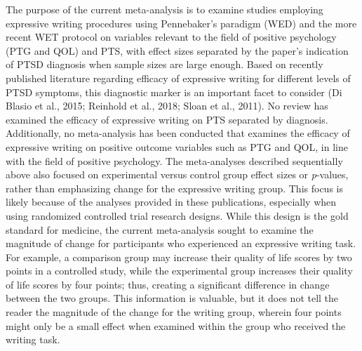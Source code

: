 \documentclass[man, mask]{apa6}
\theoremstyle{definition}
\theoremstyle{definition}
\theoremstyle{definition}
\theoremstyle{remark}
\begin{document}
The purpose of the current meta-analysis is to examine studies employing
expressive writing procedures using Pennebaker's paradigm (WED) and the
more recent WET protocol on variables relevant to the field of positive
psychology (PTG and QOL) and PTS, with effect sizes separated by the
paper's indication of PTSD diagnosis when sample sizes are large enough.
Based on recently published literature regarding efficacy of expressive
writing for different levels of PTSD symptoms, this diagnostic marker is
an important facet to consider (Di Blasio et al., 2015; Reinhold et al.,
2018; Sloan et al., 2011). No review has examined the efficacy of
expressive writing on PTS separated by diagnosis. Additionally, no
meta-analysis has been conducted that examines the efficacy of
expressive writing on positive outcome variables such as PTG and QOL, in
line with the field of positive psychology. The meta-analyses described
sequentially above also focused on experimental versus control group
effect sizes or \emph{p}-values, rather than emphasizing change for the
expressive writing group. This focus is likely because of the analyses
provided in these publications, especially when using randomized
controlled trial research designs. While this design is the gold
standard for medicine, the current meta-analysis sought to examine the
magnitude of change for participants who experienced an expressive
writing task. For example, a comparison group may increase their quality
of life scores by two points in a controlled study, while the
experimental group increases their quality of life scores by four
points; thus, creating a significant difference in change between the
two groups. This information is valuable, but it does not tell the
reader the magnitude of the change for the writing group, wherein four
points might only be a small effect when examined within the group who
received the writing task.
\end{document}
